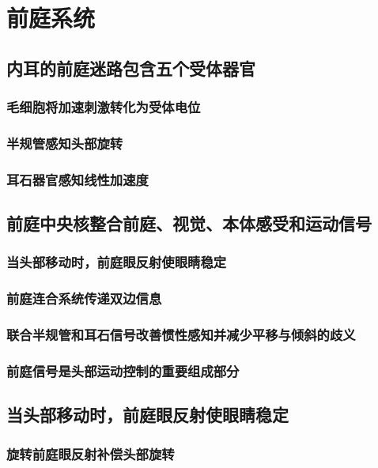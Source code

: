 \chapter{前庭系统}


\section{内耳的前庭迷路包含五个受体器官}
\subsection{毛细胞将加速刺激转化为受体电位}
\subsection{半规管感知头部旋转}
\subsection{耳石器官感知线性加速度}

\section{前庭中央核整合前庭、视觉、本体感受和运动信号}
\subsection{当头部移动时，前庭眼反射使眼睛稳定}
\subsection{前庭连合系统传递双边信息}
\subsection{联合半规管和耳石信号改善惯性感知并减少平移与倾斜的歧义}
\subsection{前庭信号是头部运动控制的重要组成部分}

\section{当头部移动时，前庭眼反射使眼睛稳定}
\subsection{旋转前庭眼反射补偿头部旋转}
